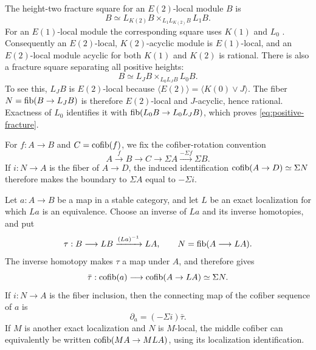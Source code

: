 The height-two fracture square for an \(E(2)\)-local module \(B\)
is
\begin{equation}\label{eq:height-two-fracture}
 B\simeq L_{K(2)}B
       \mathbin{\times}_{L_1L_{K(2)}B}L_1B.
\end{equation}
For an \(E(1)\)-local module the corresponding square uses \(K(1)\)
and \(L_0\) \cite[Section~2.4, diagram~(2.19)]{BB}.
Consequently an \(E(2)\)-local, \(K(2)\)-acyclic module is
\(E(1)\)-local, and an \(E(2)\)-local module acyclic for both
\(K(1)\) and \(K(2)\) is rational.  There is also a fracture
square separating all positive heights:
\begin{equation}\label{eq:positive-fracture}
 B\simeq L_JB\mathbin{\times}_{L_0L_JB}L_0B.
\end{equation}
To see this, \(L_JB\) is \(E(2)\)-local because
\(\langle E(2)\rangle=\langle K(0)\vee J\rangle\).
The fiber \(N=\operatorname{fib}(B\to L_JB)\) is therefore \(E(2)\)-local
and \(J\)-acyclic, hence rational.  Exactness of \(L_0\) identifies
it with \(\operatorname{fib}(L_0B\to L_0L_JB)\), which proves
\eqref{eq:positive-fracture}.

For \(f:A\to B\) and \(C=\operatorname{cofib}(f)\), we fix the
cofiber-rotation convention
\[
 A\xrightarrow{f}B\longrightarrow C\longrightarrow\Sigma A
 \xrightarrow{-\Sigma f}\Sigma B.
\]
If \(i:N\to A\) is the fiber of \(A\to D\), the induced
identification \(\operatorname{cofib}(A\to D)\simeq\Sigma N\) therefore makes
the boundary to \(\Sigma A\) equal to \(-\Sigma i\).

\begin{lemma}\label{lem:boundary}
Let \(a:A\to B\) be a map in a stable category, and let \(L\) be
an exact localization for which \(La\) is an equivalence.
Choose an inverse of \(La\) and its inverse homotopies, and put
\[
 \tau:B\longrightarrow LB\xrightarrow{(La)^{-1}}LA,\qquad
 N=\operatorname{fib}(A\longrightarrow LA).
\]
The inverse homotopy makes \(\tau\) a map under \(A\), and
therefore gives
\[
 \bar\tau:\operatorname{cofib}(a)\longrightarrow\operatorname{cofib}(A\to LA)
                         \simeq\Sigma N.
\]
If \(i:N\to A\) is the fiber inclusion, then the connecting map
of the cofiber sequence of \(a\) is
\begin{equation}\label{eq:boundary-lemma}
 \partial_a=(-\Sigma i)\bar\tau.
\end{equation}
If \(M\) is another exact localization and \(N\) is \(M\)-local,
the middle cofiber can equivalently be written
\(\operatorname{cofib}(MA\to MLA)\), using its localization identification.
\end{lemma}

